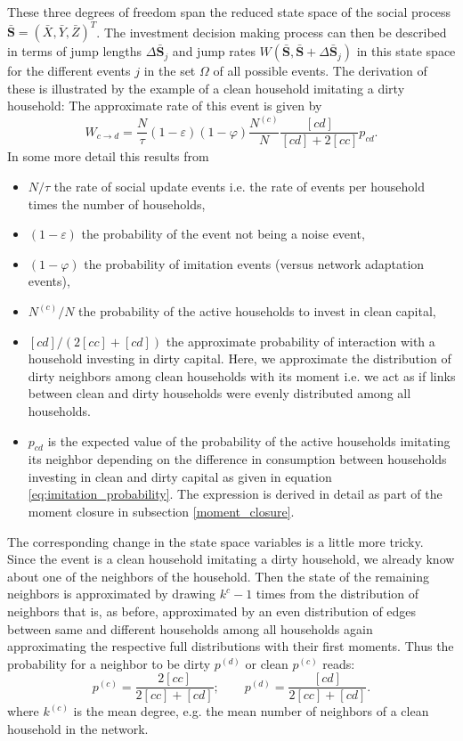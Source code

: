 These three degrees of freedom span the reduced state space of the social process $\mathbf{\bar{S}} = (\bar{X}, \bar{Y}, \bar{Z})^T$. The investment decision making process can then be described in terms of jump lengths $\Delta \mathbf{\bar{S}}_j$ and jump rates $W(\mathbf{\bar{S}},\mathbf{\bar{S}} + \Delta \mathbf{\bar{S}}_j)$ in this state space for the different events $j$ in the set $\Omega$ of all possible events.
The derivation of these is illustrated by the example of a clean household imitating a dirty household: The approximate rate of this event is given by
\begin{equation}
	W_{c \rightarrow d} = \frac{N}{\tau} (1-\varepsilon) (1 - \varphi) \frac{N^{(c)}}{N}\frac{[cd]}{[cd] + 2 [cc]}p_{cd}.
	\label{eq:cdswitchingprob}
\end{equation}
In some more detail this results from
\begin{itemize}
	\item $N/\tau$ the rate of social update events i.e. the rate of events per household times the number of households,
	\item $(1-\varepsilon)$ the probability of the event not being a noise event,
	\item $(1-\varphi)$ the probability of imitation events (versus network adaptation events),
	\item $N^{(c)}/N$ the probability of the active households to invest in clean capital,
	\item $[cd]/(2[cc] + [cd])$ the approximate probability of interaction with a household investing in dirty capital. Here, we approximate the distribution of dirty neighbors among clean households with its moment i.e. we act as if links between clean and dirty households were evenly distributed among all households. 
	\item $p_{cd}$ is the expected value of the probability of the active households imitating its neighbor depending on the difference in consumption between households investing in clean and dirty capital as given in equation \eqref{eq:imitation_probability}. The expression is derived in detail as part of the moment closure in subsection \ref{moment_closure}.
\end{itemize}
The corresponding change in the state space variables is a little more tricky. Since the event is a clean household imitating a dirty household, we already know about one of the neighbors of the household. Then the state of the remaining neighbors is approximated by drawing $k^{c} - 1$ times from the distribution of neighbors that is, as before, approximated by an even distribution of edges between same and different households among all households again approximating the respective full distributions with their first moments. Thus the probability for a neighbor to be dirty $p^{(d)}$ or clean $p^{(c)}$ reads:
\begin{equation}
	p^{(c)} = \frac{2 [cc]}{2[cc] + [cd]}; \qquad p^{(d)} = \frac{[cd]}{2[cc] + [cd]}.
\label{eq:neighbordist}
\end{equation}
where $k^{(c)}$ is the mean degree, e.g. the mean number of neighbors of a clean household in the network.

